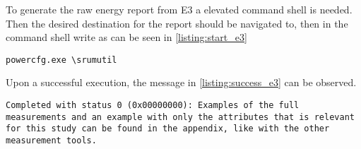To generate the raw energy report from E3 a elevated command shell is needed. Then the desired destination for the report should be navigated to, then in the command shell write as can be seen in \cref{listing:start_e3}

\begin{lstlisting}[caption=How to start E3, label=listing:start_e3]
    powercfg.exe \srumutil
\end{lstlisting}

Upon a successful execution, the message in \cref{listing:success_e3} can be observed.

\begin{lstlisting}[caption=If the report is created successfully
    , label=listing:success_e3]
    Completed with status 0 (0x00000000): Examples of the full measurements and an example with only the attributes that is relevant for this study can be found in the appendix, like with the other measurement tools.
\end{lstlisting}





% 